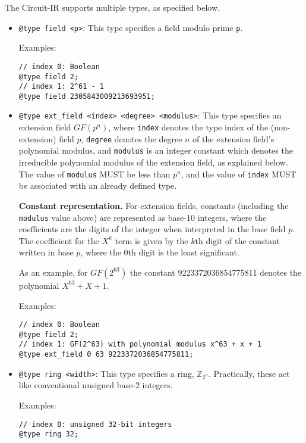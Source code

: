 The Circuit-IR supports multiple types, as specified below.
\begin{itemize}
  \item \texttt{@type field <p>}: This type specifies a field modulo prime
        \texttt{p}.

        Examples:
        \begin{lstlisting}[language=ir]
// index 0: Boolean
@type field 2;
// index 1: 2^61 - 1
@type field 2305843009213693951;
        \end{lstlisting}

  \item \texttt{@type ext\_field <index> <degree> <modulus>}: This type
        specifies an extension field $GF(p^n)$, where \texttt{index} denotes the
        type index of the (non-extension) field $p$, \texttt{degree} denotes the
        degree $n$ of the extension field's polynomial modulus, and
        \texttt{modulus} is an integer constant which denotes the irreducible
        polynomial modulus of the extension field, as explained below. The value
        of \texttt{modulus} MUST be less than $p^n$, and the value of
        \texttt{index} MUST be associated with an already defined type.

        \medskip\noindent\textbf{Constant representation.} For extension fields,
        constants (including the \texttt{modulus} value above) are represented
        as base-10 integers, where the coefficients are the digits of the
        integer when interpreted in the base field $p$. The coefficient for the
        $X^k$ term is given by the $k$th digit of the constant written in base $p$,
        where the 0th digit is the least significant.

        As an example, for $GF(2^{63})$ the constant 9223372036854775811 denotes
        the polynomial $X^{63} + X + 1$.

        Examples:
        \begin{lstlisting}[language=ir]
// index 0: Boolean
@type field 2;
// index 1: GF(2^63) with polynomial modulus x^63 + x + 1
@type ext_field 0 63 9223372036854775811;
        \end{lstlisting}

  \item \texttt{@type ring <width>}: This type specifies a ring, $\mathbb{Z}_{2^n}$.
        Practically, these act like conventional unsigned base-2 integers.

        Examples:
        \begin{lstlisting}[language=ir]
// index 0: unsigned 32-bit integers
@type ring 32;
        \end{lstlisting}
\end{itemize}



